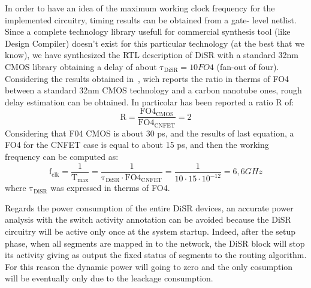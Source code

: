 In order to have an idea of the maximum working clock frequency for
the implemented circuitry, timing results can be obtained from a gate-
level netlist. Since a complete technology library usefull for
commercial synthesis tool (like Design Compiler) doesn't exist for 
this particular technology (at the best that we know), we have
synthesized the RTL description of DiSR with a standard 32nm CMOS
library obtaining  a delay of about $\mathrm{\tau_{DiSR}=10} FO4$
(fan-out of four). Considering the results obtained
in~\cite{deng_isscc07}, wich reports the ratio in therms of FO4
between a standard 32nm CMOS technology and a carbon nanotube ones, 
rough delay estimation can be obtained. In particolar has been reported a
ratio R of:  
\begin{equation}
\mathrm{R=\frac{FO4_{CMOS}}{FO4_{CNFET}}=2}  
\end{equation}
Considering that F04 CMOS is about 30 ps, and the results of last
equation, a FO4 for the CNFET case is equal to about 15 ps, and
then the working frequency can be computed as:
\begin{equation}
\mathrm{f_{clk}=\frac{1}{T_{max}}=\frac{1}{\tau_{DiSR} \cdot FO4_{CNFET}}}=
\frac{1}{10\cdot 15 \cdot 10^{-12}}=6,6 GHz
\end{equation}
where $\mathrm{\tau_{DiSR}}$ was expressed in therms of FO4.

Regards the power consumption of the entire DiSR devices, 
an accurate power analysis with the switch activity
annotation can be avoided because the DiSR circuitry will be active 
only once at the system startup. Indeed, after the setup phase, when all segments
are mapped in to the network, the DiSR block will stop its activity
giving as output the fixed status of segments to the routing
algorithm. For this reason the dynamic power will going  to zero and
the only cosumption will be eventually only due to the leackage
consumption.
